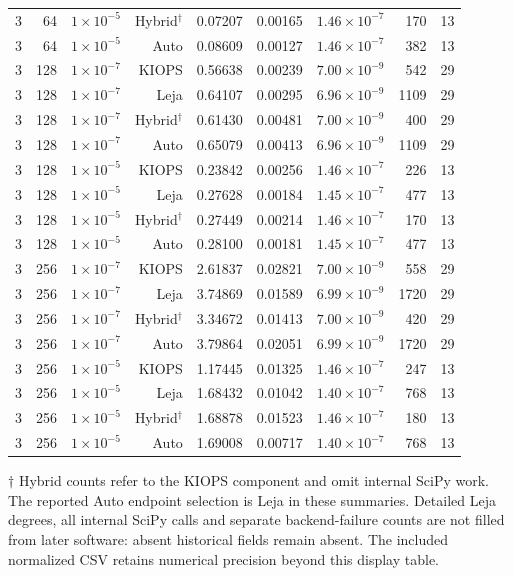 \begin{longtable}{@{}rrrrrrrrr@{}}
3 & 64 & $1\times10^{-5}$ & Hybrid$^\dagger$ & 0.07207 & 0.00165 & $1.46\times10^{-7}$ & 170 & 13 \\
3 & 64 & $1\times10^{-5}$ & Auto & 0.08609 & 0.00127 & $1.46\times10^{-7}$ & 382 & 13 \\
3 & 128 & $1\times10^{-7}$ & KIOPS & 0.56638 & 0.00239 & $7.00\times10^{-9}$ & 542 & 29 \\
3 & 128 & $1\times10^{-7}$ & Leja & 0.64107 & 0.00295 & $6.96\times10^{-9}$ & 1109 & 29 \\
3 & 128 & $1\times10^{-7}$ & Hybrid$^\dagger$ & 0.61430 & 0.00481 & $7.00\times10^{-9}$ & 400 & 29 \\
3 & 128 & $1\times10^{-7}$ & Auto & 0.65079 & 0.00413 & $6.96\times10^{-9}$ & 1109 & 29 \\
3 & 128 & $1\times10^{-5}$ & KIOPS & 0.23842 & 0.00256 & $1.46\times10^{-7}$ & 226 & 13 \\
3 & 128 & $1\times10^{-5}$ & Leja & 0.27628 & 0.00184 & $1.45\times10^{-7}$ & 477 & 13 \\
3 & 128 & $1\times10^{-5}$ & Hybrid$^\dagger$ & 0.27449 & 0.00214 & $1.46\times10^{-7}$ & 170 & 13 \\
3 & 128 & $1\times10^{-5}$ & Auto & 0.28100 & 0.00181 & $1.45\times10^{-7}$ & 477 & 13 \\
3 & 256 & $1\times10^{-7}$ & KIOPS & 2.61837 & 0.02821 & $7.00\times10^{-9}$ & 558 & 29 \\
3 & 256 & $1\times10^{-7}$ & Leja & 3.74869 & 0.01589 & $6.99\times10^{-9}$ & 1720 & 29 \\
3 & 256 & $1\times10^{-7}$ & Hybrid$^\dagger$ & 3.34672 & 0.01413 & $7.00\times10^{-9}$ & 420 & 29 \\
3 & 256 & $1\times10^{-7}$ & Auto & 3.79864 & 0.02051 & $6.99\times10^{-9}$ & 1720 & 29 \\
3 & 256 & $1\times10^{-5}$ & KIOPS & 1.17445 & 0.01325 & $1.46\times10^{-7}$ & 247 & 13 \\
3 & 256 & $1\times10^{-5}$ & Leja & 1.68432 & 0.01042 & $1.40\times10^{-7}$ & 768 & 13 \\
3 & 256 & $1\times10^{-5}$ & Hybrid$^\dagger$ & 1.68878 & 0.01523 & $1.46\times10^{-7}$ & 180 & 13 \\
3 & 256 & $1\times10^{-5}$ & Auto & 1.69008 & 0.00717 & $1.40\times10^{-7}$ & 768 & 13 \\
\end{longtable}\normalsize
$\dagger$ Hybrid counts refer to the KIOPS component and omit internal SciPy work. The reported Auto endpoint selection is Leja in these summaries. Detailed Leja degrees, all internal SciPy calls and separate backend-failure counts are not filled from later software: absent historical fields remain absent. The included normalized CSV retains numerical precision beyond this display table.
